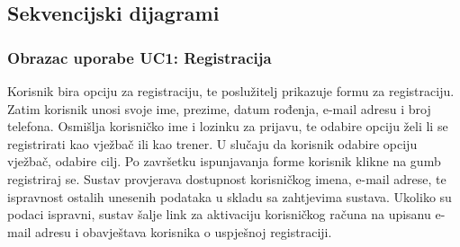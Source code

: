 				\eject		
				
			\subsection{Sekvencijski dijagrami}
   
	   			\subsubsection{Obrazac uporabe UC1: Registracija}
				\noindent Korisnik bira opciju za registraciju, te poslužitelj prikazuje formu za registraciju. Zatim korisnik unosi svoje ime, prezime, datum rođenja, e-mail adresu i broj telefona. Osmišlja korisničko ime i lozinku za prijavu, te odabire opciju želi li se registrirati kao vježbač ili kao trener. U slučaju da korisnik odabire opciju vježbač, odabire cilj. Po završetku ispunjavanja forme korisnik klikne na gumb registriraj se. Sustav provjerava dostupnost korisničkog imena, e-mail adrese, te ispravnost ostalih unesenih podataka u skladu sa zahtjevima sustava. Ukoliko su podaci ispravni, sustav šalje link za aktivaciju korisničkog računa na upisanu e-mail adresu i obavještava korisnika o uspješnoj registraciji. 


